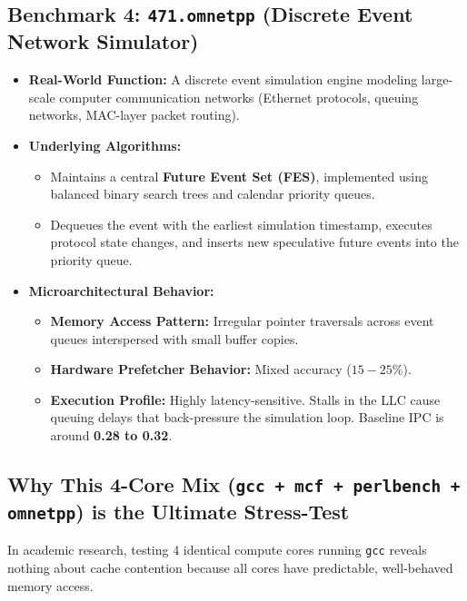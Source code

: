 \documentclass[11pt, a4paper]{article}
\begin{document}
\subsection{Benchmark 4: \texttt{471.omnetpp} (Discrete Event Network Simulator)}
\begin{itemize}[leftmargin=1.5em]
  \item \textbf{Real-World Function:} A discrete event simulation engine modeling large-scale computer communication networks (Ethernet protocols, queuing networks, MAC-layer packet routing).
  \item \textbf{Underlying Algorithms:}
  \begin{itemize}
    \item Maintains a central \textbf{Future Event Set (FES)}, implemented using balanced binary search trees and calendar priority queues.
    \item Dequeues the event with the earliest simulation timestamp, executes protocol state changes, and inserts new speculative future events into the priority queue.
  \end{itemize}
  \item \textbf{Microarchitectural Behavior:}
  \begin{itemize}
    \item \textbf{Memory Access Pattern:} Irregular pointer traversals across event queues interspersed with small buffer copies.
    \item \textbf{Hardware Prefetcher Behavior:} Mixed accuracy ($15-25\%$).
    \item \textbf{Execution Profile:} Highly latency-sensitive. Stalls in the LLC cause queuing delays that back-pressure the simulation loop. Baseline IPC is around \textbf{0.28 to 0.32}.
  \end{itemize}
\end{itemize}

\subsection{Why This 4-Core Mix (\texttt{gcc + mcf + perlbench + omnetpp}) is the Ultimate Stress-Test}
In academic research, testing 4 identical compute cores running \texttt{gcc} reveals nothing about cache contention because all cores have predictable, well-behaved memory access.
\end{document}
